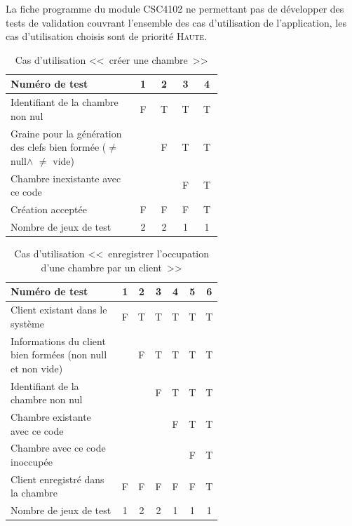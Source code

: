 \documentclass[11pt,article]{article}
\newcommand{\nullvalue}{\textsf{null}\xspace}
\begin{document}
La fiche programme du module CSC4102 ne permettant pas de développer
des tests de validation couvrant l'ensemble des cas d'utilisation de
l'application, les cas d'utilisation choisis sont de priorité
\textsc{Haute}.

\begin{table}[htbp!]
\begin{tabular}{|p{0.6\linewidth}|c|c|c|c|}
\hline
Numéro de test
&1&2&3&4\\
\hline
\hline
Identifiant de la chambre non nul
&F&T&T&T\\
\hline
Graine pour la génération des clefs bien formée ($\neq$ \nullvalue $\land$ $\neq$ vide)
& &F&T&T\\
\hline
Chambre inexistante avec ce code
& & &F&T\\
\hline
\hline
Création acceptée
&F&F&F&T\\
\hline
\hline
Nombre de jeux de test
&2&2&1&1\\
\hline
\end{tabular}
\caption{Cas d'utilisation <<~créer une chambre~>>}
\end{table}

\begin{table}[htbp!]
\begin{tabular}{|p{0.6\linewidth}|c|c|c|c|c|c|}
\hline
Numéro de test
&1&2&3&4&5&6\\
\hline
\hline
Client existant dans le système
&F&T&T&T&T&T\\
\hline
Informations du client bien formées (non \nullvalue et non vide)
& &F&T&T&T&T\\
\hline
Identifiant de la chambre non nul
& & &F&T&T&T\\
\hline
Chambre existante avec ce code
& & & &F&T&T\\
\hline
Chambre avec ce code inoccupée
& & & & &F&T\\
\hline
\hline
Client enregistré dans la chambre
&F&F&F&F&F&T\\
\hline
\hline
Nombre de jeux de test
&1&2&2&1&1&1\\
\hline
\end{tabular}
\caption{Cas d'utilisation <<~enregistrer l'occupation d'une chambre par un client~>>}
\end{table}
\end{document}
